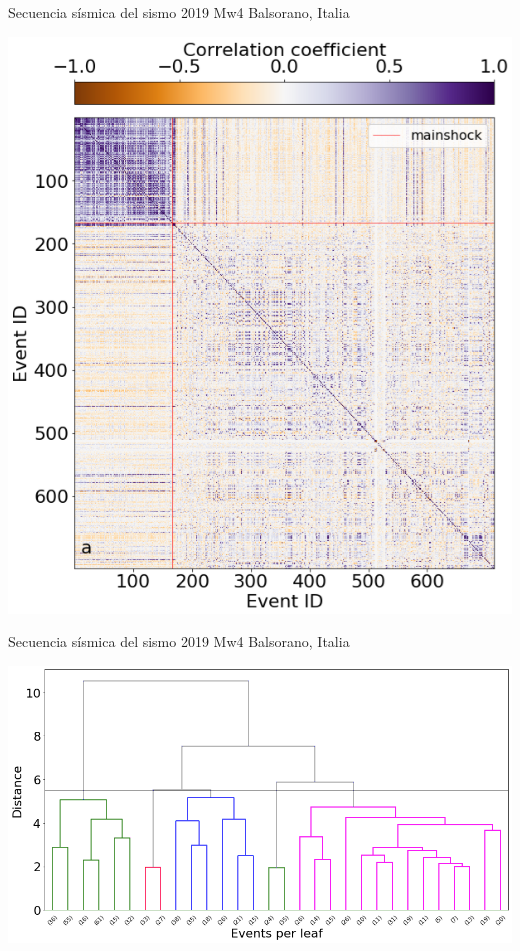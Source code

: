 \documentclass{beamer}
\begin{document}
\begin{frame}
 {Secuencia s\'ismica del sismo 2019 Mw4 Balsorano, Italia}

 \begin{minipage}{1\linewidth}
  \centering \includegraphics[width=0.65\linewidth]{images/matrix.png}
 \end{minipage} 
 
\end{frame}


\begin{frame}
 {Secuencia s\'ismica del sismo 2019 Mw4 Balsorano, Italia}

 \begin{minipage}{1\linewidth}
  \centering \includegraphics[width=1\linewidth]{images/dendrogram_balsorano.png}
 \end{minipage} 
 
\end{frame}
\end{document}
